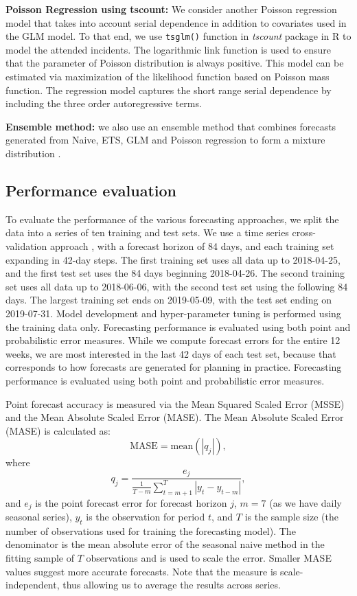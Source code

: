 \documentclass[
  authoryear,
  preprint,
  3p]{elsarticle}
\begin{document}
\textbf{Poisson Regression using tscount: } We consider another Poisson
regression model that takes into account serial dependence in addition
to covariates used in the GLM model. To that end, we use
\texttt{tsglm()} function in \emph{tscount} package in R
\citep{JSSv082i05} to model the attended incidents. The logarithmic link
function is used to ensure that the parameter of Poisson distribution is
always positive. This model can be estimated via maximization of the
likelihood function based on Poisson mass function. The regression model
captures the short range serial dependence by including the three order
autoregressive terms.

\textbf{Ensemble method:} we also use an ensemble method that combines
forecasts generated from Naive, ETS, GLM and Poisson regression to form
a mixture distribution \citep{combinations}.

\hypertarget{performance-evaluation}{%
\subsection{Performance evaluation}\label{performance-evaluation}}

To evaluate the performance of the various forecasting approaches, we
split the data into a series of ten training and test sets. We use a
time series cross-validation approach \citep{hyndman2021forecasting},
with a forecast horizon of 84 days, and each training set expanding in
42-day steps. The first training set uses all data up to 2018-04-25, and
the first test set uses the 84 days beginning 2018-04-26. The second
training set uses all data up to 2018-06-06, with the second test set
using the following 84 days. The largest training set ends on
2019-05-09, with the test set ending on 2019-07-31. Model development
and hyper-parameter tuning is performed using the training data only.
Forecasting performance is evaluated using both point and probabilistic
error measures. While we compute forecast errors for the entire 12
weeks, we are most interested in the last 42 days of each test set,
because that corresponds to how forecasts are generated for planning in
practice. Forecasting performance is evaluated using both point and
probabilistic error measures.

Point forecast accuracy is measured via the Mean Squared Scaled Error
(MSSE) and the Mean Absolute Scaled Error (MASE). The Mean Absolute
Scaled Error (MASE) \citep{HK06} is calculated as: \[
  \text{MASE} = \text{mean}(|q_{j}|),
\] where \[
  q_{j} = \frac{ e_{j}}
    {\displaystyle\frac{1}{T-m}\sum_{t=m+1}^T |y_{t}-y_{t-m}|},
\] and \(e_{j}\) is the point forecast error for forecast horizon \(j\),
\(m = 7\) (as we have daily seasonal series), \(y_t\) is the observation
for period \(t\), and \(T\) is the sample size (the number of
observations used for training the forecasting model). The denominator
is the mean absolute error of the seasonal naive method in the fitting
sample of \(T\) observations and is used to scale the error. Smaller
MASE values suggest more accurate forecasts. Note that the measure is
scale-independent, thus allowing us to average the results across
series.
\end{document}
